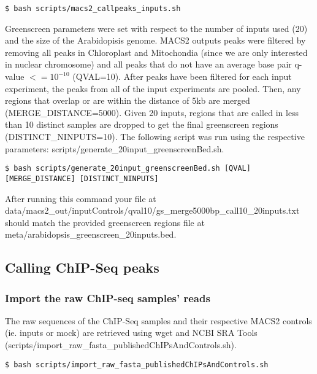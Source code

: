 \documentclass{article}
\begin{document}
\begin{sloppypar}
\begin{verbatim}
$ bash scripts/macs2_callpeaks_inputs.sh
\end{verbatim}

Greenscreen parameters were set with respect to the number of inputs used (20) and the size of the Arabidopisis genome. MACS2 outputs peaks were filtered by removing all peaks in Chloroplast and Mitochondia (since we are only interested in nuclear chromosome) and all peaks that do not have an average base pair q-value $<=10^{-10}$ (QVAL=10). After peaks have been filtered for each input experiment, the peaks from all of the input experiments are pooled. Then, any regions that overlap or are within the distance of 5kb are merged (MERGE\_DISTANCE=5000).  Given 20 inputs, regions that are called in less than 10 distinct samples are dropped to get the final greenscreen regions (DISTINCT\_NINPUTS=10). The following script was run using the respective parameters: {\selectfont scripts/generate\_20input\_greenscreenBed.sh}.

\begin{verbatim}
$ bash scripts/generate_20input_greenscreenBed.sh [QVAL] [MERGE_DISTANCE] [DISTINCT_NINPUTS]
\end{verbatim}


After running this command your file at {\selectfont data/macs2\_out/inputControls/qval10/gs\_merge5000bp\_call10\_20inputs.txt} should match the provided greenscreen regions file at {\selectfont meta/arabidopsis\_greenscreen\_20inputs.bed}.

\subsection{Calling ChIP-Seq peaks}
\subsubsection{Import the raw ChIP-seq samples' reads}
The raw sequences of the ChIP-Seq samples \cite{Zhu2020,Jin2021,Collani2019,Moyroud2011,Romera2020,Sayou2016} and their respective MACS2 controls (ie. inputs or mock) are retrieved using wget and NCBI SRA Tools ({\selectfont scripts/import\_raw\_fasta\_publishedChIPsAndControls.sh}). 

\begin{verbatim}
$ bash scripts/import_raw_fasta_publishedChIPsAndControls.sh
\end{verbatim}


\end{sloppypar}
\end{document}
